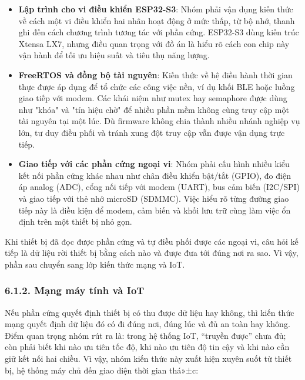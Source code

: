 \documentclass[a4paper]{extarticle}
\providecommand{\tightlist}{%
  \setlength{\itemsep}{0pt}\setlength{\parskip}{0pt}}
\begin{document}
\begin{itemize}
\tightlist
\item
  \textbf{Lập trình cho vi điều khiển ESP32-S3}: Nhóm phải vận dụng kiến
  thức về cách một vi điều khiển hai nhân hoạt động ở mức thấp, từ bộ
  nhớ, thanh ghi đến cách chương trình tương tác với phần cứng. ESP32-S3
  dùng kiến trúc Xtensa LX7, nhưng điều quan trọng với đồ án là hiểu rõ
  cách con chip này vận hành để tối ưu hiệu suất và tiêu thụ năng lượng.
\item
  \textbf{FreeRTOS và đồng bộ tài nguyên}: Kiến thức về hệ điều hành
  thời gian thực được áp dụng để tổ chức các công việc nền, ví dụ khối
  BLE hoặc luồng giao tiếp với modem. Các khái niệm như mutex hay
  semaphore được dùng như "khóa" và "tín hiệu chờ" để nhiều phần mềm
  không cùng truy cập một tài nguyên tại một lúc. Dù firmware không chia
  thành nhiều nhánh nghiệp vụ lớn, tư duy điều phối và tránh xung đột
  truy cập vẫn được vận dụng trực tiếp.
\item
  \textbf{Giao tiếp với các phần cứng ngoại vi}: Nhóm phải cấu hình nhiều
  kiểu kết nối phần cứng khác nhau như chân điều khiển bật/tắt (GPIO),
  đo điện áp analog (ADC), cổng nối tiếp với modem (UART), bus cảm biến
  (I2C/SPI) và giao tiếp với thẻ nhớ microSD (SDMMC). Việc hiểu rõ từng
  đường giao tiếp này là điều kiện để modem, cảm biến và khối lưu trữ
  cùng làm việc ổn định trên một thiết bị nhỏ gọn.
\end{itemize}

Khi thiết bị đã đọc được phần cứng và tự điều phối được các ngoại vi,
câu hỏi kế tiếp là dữ liệu rời thiết bị bằng cách nào và được đưa tới
đúng nơi ra sao. Vì vậy, phần sau chuyển sang lớp kiến thức mạng và
IoT.

\subsubsection{6.1.2. Mạng máy tính và
IoT}\label{612-mux1ea1ng-muxe1y-tuxednh-vuxe0-iot}

Nếu phần cứng quyết định thiết bị có thu được dữ liệu hay không, thì
kiến thức mạng quyết định dữ liệu đó có đi đúng nơi, đúng lúc và đủ an
toàn hay không. Điểm quan trọng nhóm rút ra là: trong hệ thống IoT,
``truyền được'' chưa đủ; còn phải biết khi nào ưu tiên tốc độ, khi nào
ưu tiên độ tin cậy và khi nào cần giữ kết nối hai chiều. Vì vậy, nhóm
kiến thức này xuất hiện xuyên suốt từ thiết bị, hệ thống máy chủ đến giao diện thời
gian thá»±c:
\end{document}
